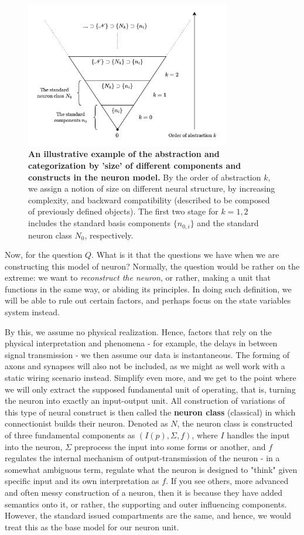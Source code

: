 \begin{figure}[h!]
    \centering
    \includegraphics[width=0.8\textwidth]{img/abstractionpps.png}
    \caption{\textbf{An illustrative example of the abstraction and categorization by 'size' of different components and constructs in the neuron model.} By the order of abstraction $k$, we assign a notion of size on different neural structure, by increasing complexity, and backward compatibility (described to be composed of previously defined objects). The first two stage for $k=1,2$ includes the standard basis components $\{n_{0,i}\}$ and the standard neuron class $N_{0}$, respectively.}
\end{figure}

Now, for the question $Q$. What is it that the questions we have when we are constructing this model of neuron? Normally, the question would be rather on the extreme: we want to \textit{reconstruct the neuron}, or rather, making a unit that functions in the same way, or abiding its principles. In doing such definition, we will be able to rule out certain factors, and perhaps focus on the state variables system instead. 

By this, we assume no physical realization. Hence, factors that rely on the physical interpretation and phenomena - for example, the delays in between signal transmission - we then assume our data is instantaneous. The forming of axons and synapses will also not be included, as we might as well work with a static wiring scenario instead. Simplify even more, and we get to the point where we will only extract the supposed fundamental unit of operating, that is, turning the neuron into exactly an input-output unit. All construction of variations of this type of neural construct is then called the \textbf{neuron class} (classical) in which connectionist builds their neuron. Denoted as $N$, the neuron class is constructed of three fundamental components as $(I(p), \Sigma, f)$, where $I$ handles the input into the neuron, $\Sigma$ preprocess the input into some forms or another, and $f$ regulates the internal mechanism of output-transmission of the neuron - in a somewhat ambiguous term, regulate what the neuron is designed to "think" given specific input and its own interpretation as $f$. If you see others, more advanced and often messy construction of a neuron, then it is because they have added semantics onto it, or rather, the supporting and outer influencing components. However, the standard issued compartments are the same, and hence, we would treat this as the base model for our neuron unit.

